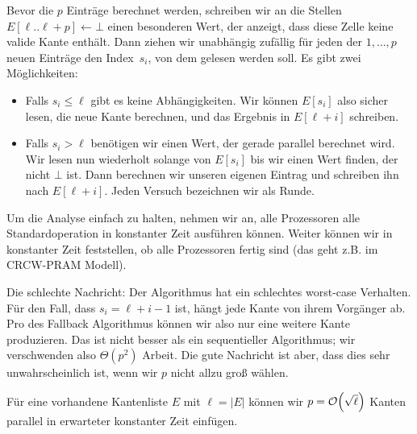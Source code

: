 Bevor die $p$ Einträge berechnet werden, schreiben wir an die Stellen $E[\ell..\ell+p] \gets \bot$ einen besonderen Wert, der anzeigt, dass diese Zelle keine valide Kante enthält.
Dann ziehen wir unabhängig zufällig für jeden der $1, \ldots, p$ neuen Einträge den Index~$s_i$, von dem gelesen werden soll.
Es gibt zwei Möglichkeiten:
\begin{itemize}
    \item Falls $s_i \le \ell$ gibt es keine Abhängigkeiten.
          Wir können $E[s_i]$ also sicher lesen, die neue Kante berechnen, und das Ergebnis in $E[\ell + i]$ schreiben.
    \item Falls $s_i > \ell$ benötigen wir einen Wert, der gerade parallel berechnet wird.
          Wir lesen nun wiederholt solange von $E[s_i]$ bis wir einen Wert finden, der nicht $\bot$ ist.
          Dann berechnen wir unseren eigenen Eintrag und schreiben ihn nach $E[\ell +i]$.
          Jeden Versuch bezeichnen wir als Runde.
\end{itemize}

Um die Analyse einfach zu halten, nehmen wir an, alle Prozessoren alle Standardoperation in konstanter Zeit ausführen können.
Weiter können wir in konstanter Zeit feststellen, ob alle Prozessoren fertig sind (das geht z.B. im CRCW-PRAM Modell).

Die schlechte Nachricht: Der Algorithmus hat ein schlechtes worst-case Verhalten.
Für den Fall, dass $s_i = \ell + i - 1$ ist, hängt jede Kante von ihrem Vorgänger ab.
Pro  des Fallback Algorithmus können wir also nur eine weitere Kante produzieren.
Das ist nicht besser als ein sequentieller Algorithmus; wir verschwenden also $\Theta(p^2)$ Arbeit.
Die gute Nachricht ist aber, dass dies sehr unwahrscheinlich ist, wenn wir $p$ nicht allzu groß wählen.

\begin{lemma}\label{lem:par_ba_einzelschritt}
    Für  eine vorhandene Kantenliste $E$ mit $\ell = |E|$ können wir $p = \mathcal{O}\!\left(\sqrt{\ell}\right)$ Kanten parallel in erwarteter konstanter Zeit einfügen.
\end{lemma}

